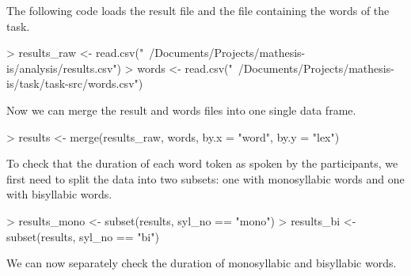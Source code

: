 \documentclass{article}
\begin{document}


The following code loads the result file and the file containing the words of the task.

\begin{Schunk}
\begin{Sinput}
> results_raw <- read.csv("~/Documents/Projects/mathesis-is/analysis/results.csv")
> words <- read.csv("~/Documents/Projects/mathesis-is/task/task-src/words.csv")
\end{Sinput}
\end{Schunk}

Now we can merge the result and words files into one single data frame.

\begin{Schunk}
\begin{Sinput}
> results <- merge(results_raw, words, by.x = "word", by.y = "lex")
\end{Sinput}
\end{Schunk}

To check that the duration of each word token as spoken by the participants, we first need to split the data into two subsets: one with monosyllabic words and one with bisyllabic words.

\begin{Schunk}
\begin{Sinput}
> results_mono <- subset(results, syl_no == "mono")
> results_bi <- subset(results, syl_no == "bi")
\end{Sinput}
\end{Schunk}

We can now separately check the duration of monosyllabic and bisyllabic words.
\end{document}
